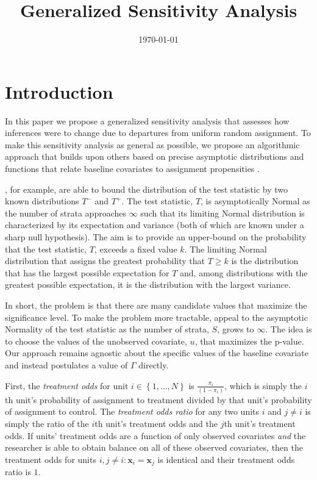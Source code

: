 \documentclass[12pt,leqno]{article}
\theoremstyle{newstyle}
\begin{document}
\begin{titlepage}
\title{Generalized Sensitivity Analysis}
\author{}
\date{\today}
\maketitle
\abstract{\noindent } \end{titlepage}
\clearpage

\doublespacing

\section{Introduction}

In this paper we propose a generalized sensitivity analysis that assesses how inferences were to change due to departures from uniform random assignment. To make this sensitivity analysis as general as possible, we propose an algorithmic approach that builds upon others based on precise asymptotic distributions and functions that relate baseline covariates to assignment propensities \citep{gastwirthetal2000,rosenbaum2018,rosenbaum1988,rosenbaumkrieger1990}. 

\citet{gastwirthetal2000}, for example, are able to bound the distribution of the test statistic by two known distributions $T^-$ and $T^+$. The test statistic, $T$, is asymptotically Normal as the number of strata approaches $\infty$ such that its limiting Normal distribution is characterized by its expectation and variance (both of which are known under a sharp null hypothesis). The aim is to provide an upper-bound on the probability that the test statistic, $T$, exceeds a fixed value $k$. The limiting Normal distribution that assigns the greatest probability that $T \geq k$ is the distribution that has the largest possible expectation for $T$ and, among distributions with the greatest possible expectation, it is the distribution with the largest variance.

In short, the problem is that there are many candidate values that maximize the significance level. To make the problem more tractable, \citet{gastwirthetal2000} appeal to the asymptotic Normality of the test statistic as the number of strata, $S$, grows to $\infty$. The idea is to choose the values of the unobserved covariate, $u$, that maximizes the p-value. Our approach remains agnostic about the specific values of the baseline covariate and instead postulates a value of $\Gamma$ directly.

First, the \textit{treatment odds} for unit $i \in \left\{1, \ldots , N\right\}$ is $\frac{\pi_i}{\left(1 - \pi_i\right)}$, which is simply the $i$th unit's probability of assignment to treatment divided by that unit's probability of assignment to control. The \textit{treatment odds ratio} for any two units $i$ and $j \neq i$ is simply the ratio of the $i$th unit's treatment odds and the $j$th unit's treatment odds. If units' treatment odds are a function of only observed covariates \textit{and} the researcher is able to obtain balance on all of these observed covariates, then the treatment odds for units $i, j \neq i: \mathbf{x}_i = \mathbf{x}_j$ is identical and their treatment odds ratio is $1$.
\end{document}

